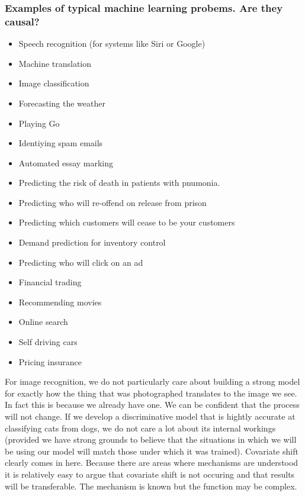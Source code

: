 \documentclass[11pt,a4paper,oneside]{book}
\begin{document}
\subsubsection*{Examples of typical machine learning probems. Are they causal?}

\begin{itemize}
\item Speech recognition (for systems like Siri or Google)
\item Machine translation 
\item Image classification
\item Forecasting the weather
\item Playing Go 
\item Identiying spam emails
\item Automated essay marking
\item Predicting the risk of death in patients with pnumonia.
\item Predicting who will re-offend on release from prison 
\item Predicting which customers will cease to be your customers
\item Demand prediction for inventory control
\item Predicting who will click on an ad
\item Financial trading
\item Recommending movies
\item Online search
\item Self driving cars
\item Pricing insurance
\end{itemize}

For image recognition, we do not particularly care about building a strong model for exactly how the thing that was photographed translates to the image we see. In fact this is because we already have one. We can be confident that the process will not change. If we develop a discriminative model that is hightly accurate at classifying cats from dogs, we do not care a lot about its internal workings (provided we have strong grounds to believe that the situations in which we will be using our model will match those under which it was trained). Covariate shift clearly comes in here. Because there are areas where mechanisms are understood it is relatively easy to argue that covariate shift is not occuring and that results will be transferable. The mechanism is known but the function may be complex. 
\end{document}
